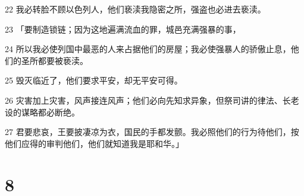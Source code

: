 \par 22 我必转脸不顾以色列人，他们亵渎我隐密之所，强盗也必进去亵渎。
\par 23 「要制造锁链；因为这地遍满流血的罪，城邑充满强暴的事，
\par 24 所以我必使列国中最恶的人来占据他们的房屋；我必使强暴人的骄傲止息，他们的圣所都要被亵渎。
\par 25 毁灭临近了，他们要求平安，却无平安可得。
\par 26 灾害加上灾害，风声接连风声；他们必向先知求异象，但祭司讲的律法、长老设的谋略都必断绝。
\par 27 君要悲哀，王要披凄凉为衣，国民的手都发颤。我必照他们的行为待他们，按他们应得的审判他们，他们就知道我是耶和华。」

\chapter{8}

